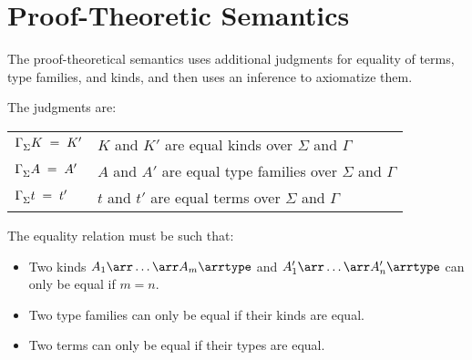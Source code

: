 \section{Proof-Theoretic Semantics}

The proof-theoretical semantics uses additional judgments for equality of terms, type families, and kinds, and then uses an inference to axiomatize them.

The judgments are:
\begin{center}
	\begin{tabular}{|l|l|}
	  \hline
		$\Gamma^{}_{\Sigma}K\;=\;K'$ & $K$ and $K'$ are equal kinds over $\Sigma$ and $\Gamma$ \\
		$\Gamma^{}_{\Sigma}A\;=\;A'$ & $A$ and $A'$ are equal type families over $\Sigma$ and $\Gamma$ \\
		$\Gamma^{}_{\Sigma}t\;=\;t'$ & $t$ and $t'$ are equal terms over $\Sigma$ and $\Gamma$ \\
		\hline
	\end{tabular}
\end{center}

The equality relation must be such that:
\begin{itemize}
 \item Two kinds $A_1\arr\ldots\arr A_m \arr\TYPE$ and $A'_1\arr\ldots\arr A'_n\arr\TYPE$ can only be equal if $m=n$.
 \item Two type families can only be equal if their kinds are equal.
 \item Two terms can only be equal if their types are equal.
\end{itemize}


